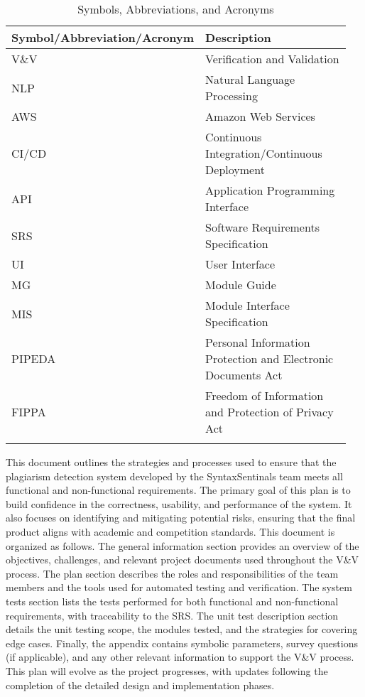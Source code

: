 \documentclass[12pt, titlepage]{article}
\begin{document}
\renewcommand{\arraystretch}{1.2}
\begin{center}
  \begin{longtable}{| p{0.475\linewidth} | p{0.475\linewidth} |}
  \hline
  \textbf{Symbol/Abbreviation/Acronym} & \textbf{Description} \\
  \hline
  V\&V & Verification and Validation \\
  \hline
  NLP & Natural Language Processing \\
  \hline
  AWS & Amazon Web Services \\
  \hline
  CI/CD & Continuous Integration/Continuous Deployment \\
  \hline
  API & Application Programming Interface \\
  \hline
  SRS & Software Requirements Specification \\
  \hline
  UI & User Interface \\
  \hline
  MG & Module Guide \\
  \hline
  MIS & Module Interface Specification \\
  \hline
  PIPEDA & Personal Information Protection and Electronic Documents Act \\
  \hline
  FIPPA & Freedom of Information and Protection of Privacy Act \\
  \hline

  \caption{Symbols, Abbreviations, and Acronyms}
  \end{longtable}
  \end{center}

\newpage


This document outlines the strategies and processes used to ensure that the plagiarism detection system  developed by the SyntaxSentinals team meets all functional 
and non-functional requirements. The primary goal of this plan is to build confidence in the correctness, usability, and performance of the system. It also focuses 
on identifying and mitigating potential risks, ensuring that the final product aligns with academic and competition standards.
This document is organized as follows. The general information section provides an overview of the objectives, challenges, and relevant project documents 
used throughout the V\&V process. The plan section describes the roles and responsibilities of the team members and the tools used for automated testing and verification. 
The system tests section lists the tests performed for both functional and non-functional requirements, with traceability to the SRS. 
The unit test description section details the unit testing scope, the modules tested, and the strategies for covering edge cases. Finally, the appendix contains symbolic parameters, 
survey questions (if applicable), and any other relevant information to support the V\&V process. This plan will evolve as the project progresses, with updates following the completion 
of the detailed design and implementation phases.
\end{document}
